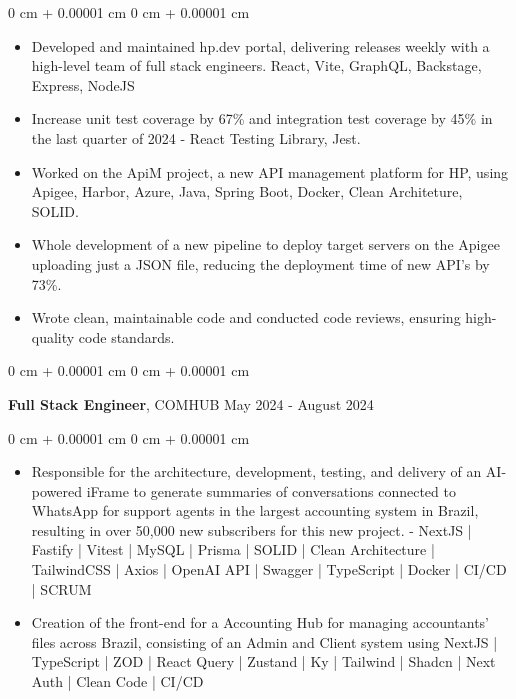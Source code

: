 \documentclass[10pt, letterpaper]{article}
\newenvironment{highlights}{ \begin{itemize}[ topsep=0.10 cm, parsep=0.10 cm, partopsep=0pt,
itemsep=0pt, leftmargin=0 cm + 10pt ] }{ \end{itemize} } %
\newenvironment{onecolentry}{ \begin{adjustwidth}{ 0 cm + 0.00001 cm }{ 0 cm + 0.00001 cm }
}{ \end{adjustwidth} } %
\newenvironment{twocolentry}[2][]{ \onecolentry \def\secondColumn{#2} \setcolumnwidth{\fill, 4.5 cm}
\begin{paracol}{2} }{ \switchcolumn \raggedleft \secondColumn \end{paracol}
\endonecolentry } %
\begin{document}
	\vspace{0.10 cm}
	\begin{onecolentry}
		\begin{highlights}
			\item Developed and maintained hp.dev portal, delivering releases weekly with a high-level team of full stack engineers. React, Vite, GraphQL, Backstage, Express, NodeJS
			\item Increase unit test coverage by 67\% and integration test coverage by 45\% in the last quarter of 2024 - React Testing Library, Jest.
			\item Worked on the ApiM project, a new API management platform for HP, using Apigee, Harbor, Azure, Java, Spring Boot, Docker, Clean Architeture, SOLID.
            \item Whole development of a new pipeline to deploy target servers on the Apigee uploading just a JSON file, reducing the deployment time of new API's by 73\%.
			\item Wrote clean, maintainable code and conducted code reviews, ensuring high-quality code standards.
		\end{highlights}
	\end{onecolentry}
	
	\vspace{0.2 cm}
	
	\begin{twocolentry}
		{ May 2024 - August 2024 } \textbf{Full Stack Engineer}, COMHUB
	\end{twocolentry}
	
	\vspace{0.10 cm}
	\begin{onecolentry}
		\begin{highlights}
			\item Responsible for the architecture, development, testing, and delivery of an AI-powered iFrame to generate summaries of
            conversations connected to WhatsApp for support agents in the largest accounting system in Brazil, resulting in over 50,000 new
            subscribers for this new project. - NextJS | Fastify | Vitest | MySQL | Prisma | SOLID | Clean Architecture | TailwindCSS | Axios |
            OpenAI API | Swagger | TypeScript | Docker | CI/CD | SCRUM
			\item Creation of the front-end for a Accounting Hub for managing accountants' files across Brazil, consisting of an Admin and Client
            system using NextJS | TypeScript | ZOD | React Query | Zustand | Ky | Tailwind | Shadcn | Next Auth | Clean Code | CI/CD
		\end{highlights}
	\end{onecolentry}
	
\end{document}
